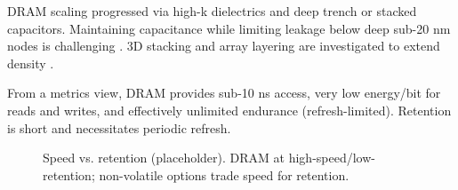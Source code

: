 DRAM scaling progressed via high-k dielectrics and deep trench or stacked capacitors. Maintaining capacitance while limiting leakage below deep sub-20 nm nodes is challenging \cite{choi2022}. 3D stacking and array layering are investigated to extend density \cite{kim2021_dram,iedm2023_dram}.

From a metrics view, DRAM provides sub-10 ns access, very low energy/bit for reads and writes, and effectively unlimited endurance (refresh-limited). Retention is short and necessitates periodic refresh.

\begin{figure}[!t]
  \centering
  \fbox{\rule{0pt}{1.10in}\rule{0.95\linewidth}{0pt}}
  \caption{Speed vs. retention (placeholder). DRAM at high-speed/low-retention; non-volatile options trade speed for retention.}
  \label{fig:speed_retention}
\end{figure}
